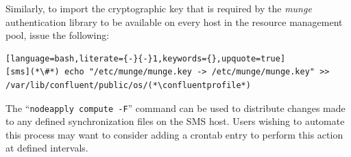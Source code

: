 \noindent Similarly, to import the
cryptographic
key
that is required by the {\em munge}
authentication library to be available on every host in the resource management
pool, issue the following:

\begin{lstlisting}[language=bash,literate={-}{-}1,keywords={},upquote=true]
[sms](*\#*) echo "/etc/munge/munge.key -> /etc/munge/munge.key" >> /var/lib/confluent/public/os/(*\confluentprofile*)
\end{lstlisting}

\begin{center}
\begin{tcolorbox}[]
\small
The ``\texttt{nodeapply compute -F}'' command can be used to distribute changes made to any
defined synchronization files on the SMS host. Users wishing to automate this process may
want to consider adding a crontab entry to perform this action at defined intervals.
\end{tcolorbox}
\end{center}
